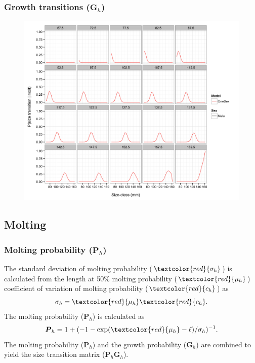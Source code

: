 \documentclass{beamer}
\begin{document}

\begin{frame}
\frametitle{Growth transitions ($\boldsymbol{G}_h$)}
\begin{figure}[!htbp]
  \centering
  \includegraphics[width=0.75\linewidth]{../../examples/bbrkc/OneSex/figure/growth_transition.png}
\end{figure}
\end{frame}


\subsection{Molting}
\begin{frame}
\frametitle{Molting probability ($\boldsymbol{P}_h$)}
The standard deviation of molting probability ($\textcolor{red}{\sigma_h}$) is
calculated from the length at 50\% molting probability
($\textcolor{red}{\mu_h}$) coefficient of variation of molting probability
($\textcolor{red}{c_h}$) as
\begin{equation*}
  \sigma_h = \textcolor{red}{\mu_h} \textcolor{red}{c_h}.
\end{equation*}
The molting probability ($\boldsymbol{P}_h$) is calculated as
\begin{equation*}
  \boldsymbol{P}_h = 1 + (-1 - \exp(\textcolor{red}{\mu_h} - \ell) / \sigma_h)^{-1}.
\end{equation*}
The molting probability ($\boldsymbol{P}_h$) and the growth probability
($\boldsymbol{G}_h$) are combined to yield the size transition matrix
($\boldsymbol{P}_h \boldsymbol{G}_h$).
\end{frame}
\end{document}
